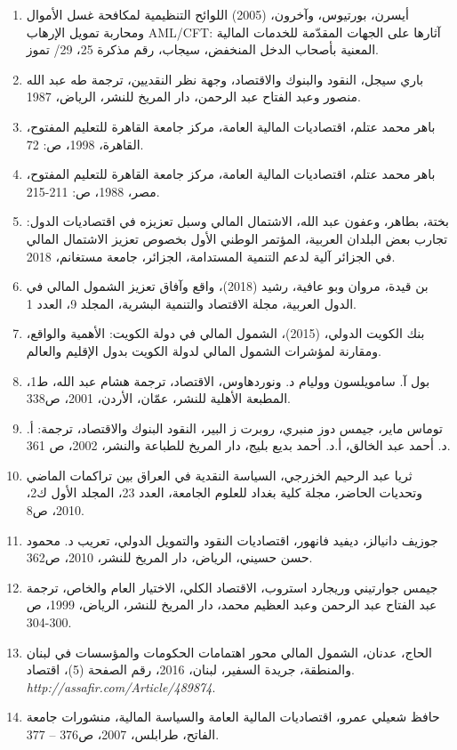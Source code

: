 \documentclass[10pt,a4paper]{report}
\begin{document}
\begin{enumerate}
	\item أيسرن، بورتيوس، وآخرون، (2005) اللوائح التنظيمية لمكافحة غسل الأموال ومحاربة تمويل الإرهاب \textenglish{AML/CFT}: آثارها على الجهات المقدّمة للخدمات المالية المعنية بأصحاب الدخل المنخفض، \textenglish{سيجاب}، رقم مذكرة 25، 29/ تموز.
	\item باري سيجل، النقود والبنوك والاقتصاد، وجهة نظر النقديين، ترجمة طه عبد الله منصور وعبد الفتاح عبد الرحمن، دار المريخ للنشر، الرياض، 1987.
	\item باهر محمد عتلم، اقتصاديات المالية العامة، مركز جامعة القاهرة للتعليم المفتوح، القاهرة، 1998، ص: 72.
	\item باهر محمد عتلم، اقتصاديات المالية العامة، مركز جامعة القاهرة للتعليم المفتوح، مصر، 1988، ص: 211-215.
	\item بختة، بطاهر، وعفون عبد الله، الاشتمال المالي وسبل تعزيزه في اقتصاديات الدول: تجارب بعض البلدان العربية، المؤتمر الوطني الأول بخصوص تعزيز الاشتمال المالي في الجزائر آلية لدعم التنمية المستدامة، الجزائر، جامعة مستغانم، 2018.
	\item بن قيدة، مروان وبو عافية، رشيد (2018)، واقع وآفاق تعزيز الشمول المالي في الدول العربية، مجلة الاقتصاد والتنمية البشرية، المجلد 9، العدد 1.
	\item بنك الكويت الدولي، (2015)، الشمول المالي في دولة الكويت: الأهمية والواقع، ومقارنة لمؤشرات الشمول المالي لدولة الكويت بدول الإقليم والعالم.
	    \item بول آ. سامويلسون ووليام د. ونوردهاوس، الاقتصاد، ترجمة هشام عبد الله، ط1، المطبعة الأهلية للنشر، عمّان، الأردن، 2001، ص338.
	\item توماس ماير، جيمس دوز منبري، روبرت ز البير، النقود البنوك والاقتصاد، ترجمة: أ. د. أحمد عبد الخالق، أ.د. أحمد بديع بليج، دار المريخ للطباعة والنشر، 2002، ص 361.
	\item ثريا عبد الرحيم الخزرجي، السياسة النقدية في العراق بين تراكمات الماضي وتحديات الحاضر، مجلة كلية بغداد للعلوم الجامعة، العدد 23، المجلد الأول ك2، 2010، ص8.
	\item جوزيف دانيالز، ديفيد فانهور، اقتصاديات النقود والتمويل الدولي، تعريب د. محمود حسن حسيني، الرياض، دار المريخ للنشر، 2010، ص362.
	\item جيمس جوارتيني وريجارد استروب، الاقتصاد الكلي، الاختيار العام والخاص، ترجمة عبد الفتاح عبد الرحمن وعبد العظيم محمد، دار المريخ للنشر، الرياض، 1999، ص 300-304.
	\item الحاج، عدنان، الشمول المالي محور اهتمامات الحكومات والمؤسسات في لبنان والمنطقة، جريدة السفير، لبنان، 2016، رقم الصفحة (5)، اقتصاد. \textit{http://assafir.com/Article/489874}.
	\item حافظ شعيلي عمرو، اقتصاديات المالية العامة والسياسة المالية، منشورات جامعة الفاتح، طرابلس، 2007، ص376 – 377.

\end{enumerate}
\end{document}
